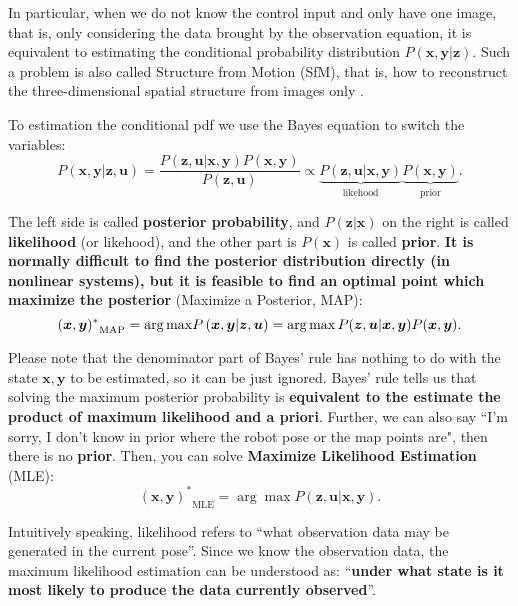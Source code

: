 In particular, when we do not know the control input and only have one image, that is, only considering the data brought by the observation equation, it is equivalent to estimating  the conditional probability distribution $ P (\bm {x}, \bm {y} | \bm { z}) $. Such a problem is also called Structure from Motion (SfM), that is, how to reconstruct the three-dimensional spatial structure from images only \textsuperscript {\cite {Agarwal2009}}.

To estimation the conditional pdf we use the Bayes equation to switch the variables:
\begin{equation}
P\left( { \bm{x},\bm{y}| \bm{z}, \bm{u}} \right) = \frac{{P\left( {\bm{z},\bm{u}|\bm{x},\bm{y}} \right)P\left( \bm{x}, \bm{y} \right)}}{{P\left( \bm{z},\bm{u}\right)}} \propto \underbrace{P\left(  { \bm{z},\bm{u}| \bm{x},\bm{y} } \right)}_{\text{likehood}} \underbrace{P\left( \bm{x},\bm{y} \right)}_{\text{prior}}.
\end{equation}

The left side is called \textbf {posterior probability}, and $ P (\bm {z} | \bm {x}) $ on the right is called \textbf {likelihood} (or likehood), and the other part is $ P (\bm {x}) $ is called \textbf {prior}. \textbf {It is normally difficult to find the posterior distribution directly (in nonlinear systems), but it is feasible to find an optimal point which maximize the posterior} (Maximize a Posterior, MAP):
\begin{equation}
{(\bm{x},\bm{y})^*}_{\mathrm{MAP}} = \arg {\mathop{\rm max}\nolimits} P \left( {\bm{x},\bm{y}|\bm{z},\bm{u}} \right) = \arg \max P(\bm{z},\bm{u}|\bm{x},\bm{y})P(\bm{x},\bm{y}).
\end{equation}

Please note that the denominator part of Bayes' rule has nothing to do with the state $ \bm {x}, \bm {y} $ to be estimated, so it can be just ignored. Bayes' rule tells us that solving the maximum posterior probability is \textbf {equivalent to the estimate the product of maximum likelihood and a priori}. Further, we can also say ``I'm sorry, I don't know in prior where the robot pose or the map points are", then there is no \textbf {prior}. Then, you can solve \textbf {Maximize Likelihood Estimation} (MLE):
\begin{equation}
{ (\bm{x},\bm{y})^*}_{\mathrm{MLE}} = \arg \max P( \bm{z},\bm{u}| \bm{x},\bm{y}).
\end{equation}

Intuitively speaking, likelihood refers to ``what observation data may be generated in the current pose''. Since we know the observation data, the maximum likelihood estimation can be understood as: ``\textbf{under what state is it most likely to produce the data currently observed}''. 

